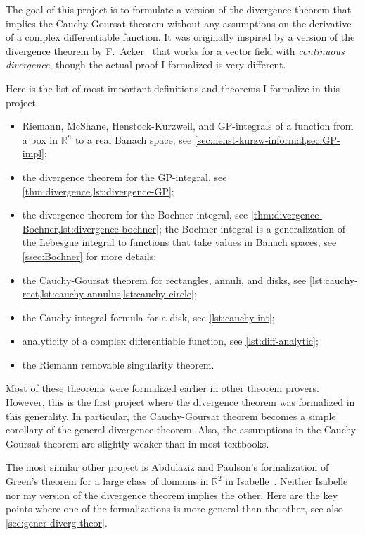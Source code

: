 \documentclass[a4paper, UKenglish,cleveref, autoref, thm-restate]{lipics-v2021}
\newcommand{\bbR}{\mathbb{R}}
\begin{document}
The goal of this project is to formulate a version of the divergence
theorem that implies the Cauchy-Goursat theorem without any
assumptions on the derivative of a complex differentiable function. It
was originally inspired by a version of the divergence theorem by
F.~Acker~\cite{Acker1996} that works for a vector field with
\emph{continuous divergence}, though the actual proof I formalized is
very different.

Here is the list of most important definitions and theorems I
formalize in this project.
\begin{itemize}
\item Riemann, McShane, Henstock-Kurzweil, and GP-integrals of a
  function from a box in \(\bbR^{n}\) to a real Banach space, see
  \cref{sec:henst-kurzw-informal,sec:GP-impl};
\item the divergence theorem for the GP-integral, see
  \cref{thm:divergence,lst:divergence-GP};
\item the divergence theorem for the Bochner integral, see
  \cref{thm:divergence-Bochner,lst:divergence-bochner}; the Bochner
  integral is a generalization of the Lebesgue integral to functions
  that take values in Banach spaces, see \autoref{ssec:Bochner} for
  more details;
\item the Cauchy-Goursat theorem for rectangles, annuli, and disks,
  see \cref{lst:cauchy-rect,lst:cauchy-annulus,lst:cauchy-circle};
\item the Cauchy integral formula for a disk, see \cref{lst:cauchy-int};
\item analyticity of a complex differentiable function, see
  \cref{lst:diff-analytic};
\item the Riemann removable singularity theorem.
\end{itemize}

Most of these theorems were formalized earlier in other theorem
provers. However, this is the first project where the divergence
theorem was formalized in this generality. In particular, the
Cauchy-Goursat theorem becomes a simple corollary of the general
divergence theorem. Also, the assumptions in the Cauchy-Goursat
theorem are slightly weaker than in most textbooks.

The most similar other project is Abdulaziz and Paulson's
formalization of Green's theorem for a large class of domains in
\(\bbR^{2}\) in Isabelle~\cite{Abdulaziz_Paulson}. Neither Isabelle
nor my version of the divergence theorem implies the other. Here are
the key points where one of the formalizations is more general than
the other, see also \autoref{sec:gener-diverg-theor}.
\end{document}
